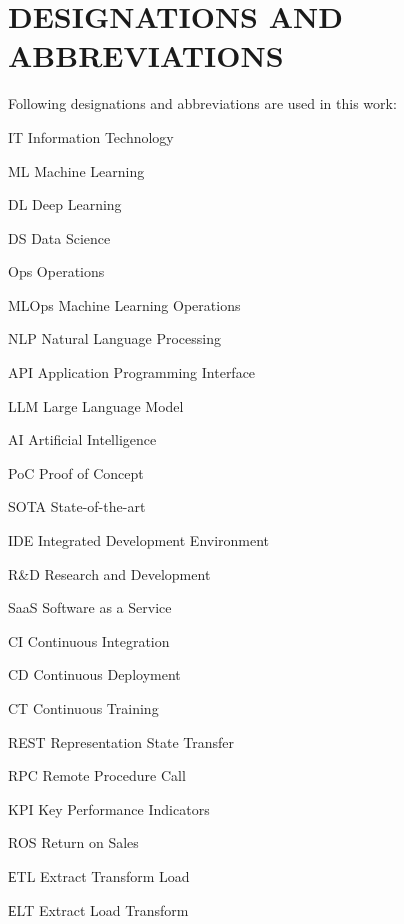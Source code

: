 \chapter*[Designations and abbreviations]{DESIGNATIONS AND ABBREVIATIONS}

Following designations and abbreviations are used in this work:

\begin{glossaries}[3cm] %
    \item [IT] Information Technology
    \item [ML] Machine Learning
    \item [DL] Deep Learning
    \item [DS] Data Science
    \item [Ops] Operations
    \item [MLOps] Machine Learning Operations
    \item [NLP] Natural Language Processing
    \item [API] Application Programming Interface
    \item [LLM] Large Language Model
    \item [AI] Artificial Intelligence
    \item [PoC] Proof of Concept
    \item [SOTA] State-of-the-art
    \item [IDE] Integrated Development Environment 
    \item [R\&D] Research and Development
    \item [SaaS] Software as a Service
    \item [CI] Continuous Integration
    \item [CD] Continuous Deployment
    \item [CT] Continuous Training
    \item [REST] Representation State Transfer
    \item [RPC] Remote Procedure Call
    \item [KPI] Key Performance Indicators
    \item [ROS] Return on Sales
    \item [ЕTL] Extract Transform Load
    \item [ЕLT] Extract Load Transform
\end{glossaries}








